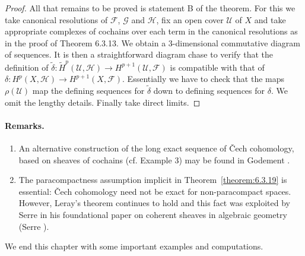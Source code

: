 \begin{proof}
All that remains to be proved is statement B of the theorem. For this we take canonical resolutions of $\mathcal F$, $\mathcal G$ and $\mathcal H$, fix an open cover $\mathcal U$ of $X$ and take appropriate complexes of cochains over each term in the canonical resolutions as in the proof of Theorem 6.3.13. We obtain a 3-dimensional commutative diagram of sequences. It is then a straightforward diagram chase to verify that the definition of $\widetilde\delta:\widetilde H^p(\mathcal U,\mathcal H)\to H^{p+1}(\mathcal U,\mathcal F)$ is compatible with that of $\delta:H^p(X,\mathcal H)\to H^{p+1}(X,\mathcal F)$. Essentially we have to check that the maps $\rho(\mathcal U)$ map the defining sequences for $\widetilde\delta$ down to defining sequences for $\delta$. We omit the lengthy details. Finally take direct limits.
\end{proof}
\paragraph{Remarks.}
\begin{enumerate}
\item An alternative construction of the long exact sequence of \v{C}ech cohomology, based on sheaves of cochains (cf. Example 3) may be found in Godement \cite{bib:II:godement-r:1}.
\item The paracompactness assumption implicit in Theorem~\ref{theorem:6.3.19} is essential: \v{C}ech cohomology need not be exact for non-paracompact spaces. However, Leray's theorem continues to hold and this fact was exploited by Serre in his foundational paper on coherent sheaves in algebraic geometry (Serre \cite{bib:II:serre-j-p:2}).
\end{enumerate}
We end this chapter with some important examples and computations.
